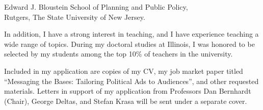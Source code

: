 \documentclass[12pt]{letter}
\begin{document}
\begin{letter}{Edward J. Bloustein School of Planning and Public Policy,\\
Rutgers, The State University of New Jersey.}





In addition, I have a strong interest in teaching, and I have experience teaching a wide range of topics.
During my doctoral studies at Illinois, I was honored to be selected by my students among the top 10\% of teachers in the university.


Included in my application are copies of my CV, my job market paper titled ``Messaging the Bases: Tailoring Political Ads to Audiences'',
and other requested materials.
Letters in support of my application from Professors Dan Bernhardt (Chair), George Deltas, and Stefan Krasa will be sent under a separate cover. 


\end{letter}
\end{document}
